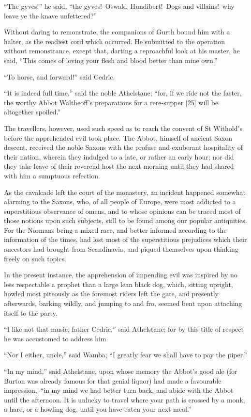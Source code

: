 ``The gyves!'' he said, ``the gyves!--Oswald--Hundibert!--Dogs and
villains!--why leave ye the knave unfettered?''

Without daring to remonstrate, the companions of Gurth bound him with a
halter, as the readiest cord which occurred. He submitted to the
operation without remonstrance, except that, darting a reproachful look
at his master, he said, ``This comes of loving your flesh and blood
better than mine own.''

``To horse, and forward!'' said Cedric.

``It is indeed full time,'' said the noble Athelstane; ``for, if we ride
not the faster, the worthy Abbot Waltheoff's preparations for a
rere-supper {[}25{]} will be altogether spoiled.''

The travellers, however, used such speed as to reach the convent of St
Withold's before the apprehended evil took place. The Abbot, himself of
ancient Saxon descent, received the noble Saxons with the profuse and
exuberant hospitality of their nation, wherein they indulged to a late,
or rather an early hour; nor did they take leave of their reverend host
the next morning until they had shared with him a sumptuous refection.

As the cavalcade left the court of the monastery, an incident happened
somewhat alarming to the Saxons, who, of all people of Europe, were most
addicted to a superstitious observance of omens, and to whose opinions
can be traced most of those notions upon such subjects, still to be
found among our popular antiquities. For the Normans being a mixed race,
and better informed according to the information of the times, had lost
most of the superstitious prejudices which their ancestors had brought
from Scandinavia, and piqued themselves upon thinking freely on such
topics.

In the present instance, the apprehension of impending evil was inspired
by no less respectable a prophet than a large lean black dog, which,
sitting upright, howled most piteously as the foremost riders left the
gate, and presently afterwards, barking wildly, and jumping to and fro,
seemed bent upon attaching itself to the party.

``I like not that music, father Cedric,'' said Athelstane; for by this
title of respect he was accustomed to address him.

``Nor I either, uncle,'' said Wamba; ``I greatly fear we shall have to
pay the piper.''

``In my mind,'' said Athelstane, upon whose memory the Abbot's good ale
(for Burton was already famous for that genial liquor) had made a
favourable impression,--``in my mind we had better turn back, and abide
with the Abbot until the afternoon. It is unlucky to travel where your
path is crossed by a monk, a hare, or a howling dog, until you have
eaten your next meal.''

